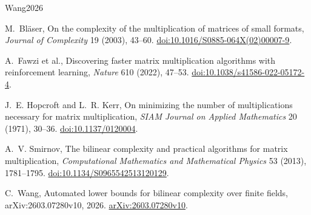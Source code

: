 \documentclass[10pt]{article}
\theoremstyle{remark}
\begin{document}
\begingroup
\small
\begin{thebibliography}{Wang2026}

M.~Bl\"aser,
\newblock On the complexity of the multiplication of matrices of small formats,
\newblock \emph{Journal of Complexity} 19 (2003), 43--60.
\newblock \href{https://doi.org/10.1016/S0885-064X(02)00007-9}{doi:10.1016/S0885-064X(02)00007-9}.

A.~Fawzi et al.,
\newblock Discovering faster matrix multiplication algorithms with
reinforcement learning,
\newblock \emph{Nature} 610 (2022), 47--53.
\newblock \href{https://doi.org/10.1038/s41586-022-05172-4}{doi:10.1038/s41586-022-05172-4}.

J.~E. Hopcroft and L.~R. Kerr,
\newblock On minimizing the number of multiplications necessary for matrix
multiplication,
\newblock \emph{SIAM Journal on Applied Mathematics} 20 (1971), 30--36.
\newblock \href{https://doi.org/10.1137/0120004}{doi:10.1137/0120004}.

A.~V. Smirnov,
\newblock The bilinear complexity and practical algorithms for matrix
multiplication,
\newblock \emph{Computational Mathematics and Mathematical Physics} 53 (2013),
1781--1795.
\newblock \href{https://doi.org/10.1134/S0965542513120129}{doi:10.1134/S0965542513120129}.

C.~Wang,
\newblock Automated lower bounds for bilinear complexity over finite fields,
\newblock arXiv:2603.07280v10, 2026.
\newblock \href{https://arxiv.org/abs/2603.07280v10}{arXiv:2603.07280v10}.

\end{thebibliography}
\endgroup
\end{document}
